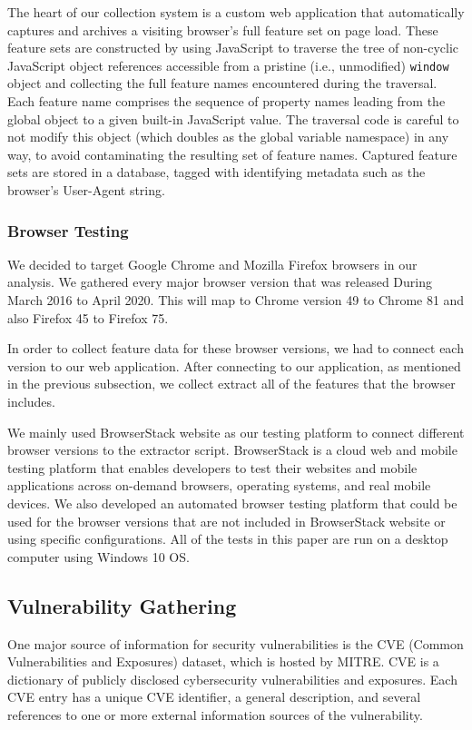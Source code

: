The heart of our collection system is a custom web application that automatically captures and archives a visiting browser's full feature set on page load.
These feature sets are constructed by using JavaScript to traverse the tree of non-cyclic JavaScript object references accessible from a pristine (i.e., unmodified) \texttt{window} object and collecting the full feature names encountered during the traversal.
Each feature name comprises the sequence of property names leading from the global object to a given built-in JavaScript value.
The traversal code is careful to not modify this object (which doubles as the global variable namespace) in any way, to avoid contaminating the resulting set of feature names.
Captured feature sets are stored in a database, tagged with identifying metadata such as the browser's User-Agent string.

\subsubsection{Browser Testing}

We decided to target Google Chrome and Mozilla Firefox browsers in our analysis. We gathered every major browser version that was released During March 2016 to April 2020. This will map to Chrome version 49 to Chrome 81 and also Firefox 45 to Firefox 75.

In order to collect feature data for these browser versions, we had to connect each version to our web application. After connecting to our application, as mentioned in the previous subsection, we collect extract all of the features that the browser includes.

We mainly used BrowserStack website as our testing platform to connect different browser versions to the extractor script. BrowserStack is a cloud web and mobile testing platform that enables developers to test their websites and mobile applications across on-demand browsers, operating systems, and real mobile devices. We also developed an automated browser testing platform that could be used for the browser versions that are not included in BrowserStack website or using specific configurations.
All of the tests in this paper are run on a desktop computer using Windows 10 OS.

\subsection{Vulnerability Gathering}
One major source of information for security vulnerabilities is the CVE (Common Vulnerabilities and Exposures) dataset,
which is hosted by MITRE. CVE is a dictionary of publicly disclosed cybersecurity vulnerabilities and exposures. Each CVE entry
has a unique CVE identifier, a general description, and several references to one or more external information sources of
the vulnerability.

